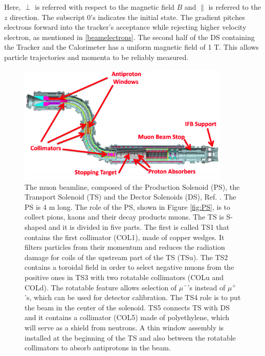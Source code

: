 Here, $\perp$ is referred with respect to the magnetic field $B$ and $\parallel$ is referred to the $z$ direction. The subscript 0’s indicates the initial state. The gradient pitches electrons forward into the tracker's acceptance while rejecting higher velocity electron, as mentioned in \ref{beamelectrons}. 
The second half of the DS containing the Tracker and the Calorimeter has a uniform magnetic field of 1 T. This allows particle trajectories and momenta to be reliably measured.
\begin{figure}[!h]
\centering
\includegraphics[width =0.9\textwidth]{figures/png/Screenshot_20240303_152845.png}
\caption{The muon beamline, composed of the Production Solenoid (PS), the Transport Solenoid (TS) and the Dector Solenoids (DS), Ref. \cite{ginther}. The PS is 4 m long. The role of the PS, shown in Figure \ref{fig:PS}, is to collect pions, kaons and their decay products muons. The TS is S-shaped and it is divided in five parts. The first is called TS1 that contains the first collimator (COL1), made of copper wedges. It filters particles from their momentum and reduces the radiation damage for coils of the upstream part of the TS (TSu). The TS2 contains a toroidal field in order to select negative muons from the positive ones in TS3 with two rotatable collimators (COLu and COLd). The rotatable feature allows selection of $\mu^-$'s instead of $\mu^+$'s, which can be used for detector calibration. The TS4 role is to put the beam in the center of the solenoid. TS5 connects TS with DS and it contains a collimator (COL5) made of polyethylene, which will serve as a shield from neutrons. A thin window assembly is installed at the beginning of the TS and also between the rotatable collimators to absorb antiprotons in the beam.
}
\end{figure}
